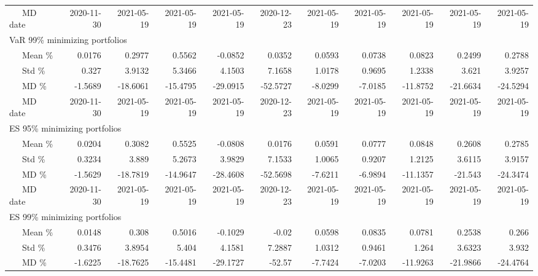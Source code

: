\begin{table}[!]
{\begin{tabular}{l*{10}{r}}
\ \ \ MD date &  2020-11-30 &  2021-05-19 &  2021-05-19 &  2021-05-19 &  2020-12-23 &  2021-05-19 &  2021-05-19 &  2021-05-19 &  2021-05-19 &  2021-05-19 \\
  \multicolumn{10}{l}{VaR 99\% minimizing portfolios}   \\
\ \ \ Mean \%  &      0.0176 &      0.2977 &      0.5562 &     -0.0852 &      0.0352 &      0.0593 &      0.0738 &      0.0823 &      0.2499 &      0.2788 \\
\ \ \ Std \%   &       0.327 &      3.9132 &      5.3466 &      4.1503 &      7.1658 &      1.0178 &      0.9695 &      1.2338 &       3.621 &      3.9257 \\
\ \ \ MD \%    &     -1.5689 &    -18.6061 &    -15.4795 &    -29.0915 &    -52.5727 &     -8.0299 &     -7.0185 &    -11.8752 &    -21.6634 &    -24.5294 \\
\ \ \ MD date &  2020-11-30 &  2021-05-19 &  2021-05-19 &  2021-05-19 &  2020-12-23 &  2021-05-19 &  2021-05-19 &  2021-05-19 &  2021-05-19 &  2021-05-19 \\
  \multicolumn{10}{l}{ES 95\% minimizing portfolios}   \\
\ \ \ Mean \%  &      0.0204 &      0.3082 &      0.5525 &     -0.0808 &      0.0176 &      0.0591 &      0.0777 &      0.0848 &      0.2608 &      0.2785 \\
\ \ \ Std \%   &      0.3234 &       3.889 &      5.2673 &      3.9829 &      7.1533 &      1.0065 &      0.9207 &      1.2125 &      3.6115 &      3.9157 \\
\ \ \ MD \%    &     -1.5629 &    -18.7819 &    -14.9647 &    -28.4608 &    -52.5698 &     -7.6211 &     -6.9894 &    -11.1357 &     -21.543 &    -24.3474 \\
\ \ \ MD date &  2020-11-30 &  2021-05-19 &  2021-05-19 &  2021-05-19 &  2020-12-23 &  2021-05-19 &  2021-05-19 &  2021-05-19 &  2021-05-19 &  2021-05-19 \\
  \multicolumn{10}{l}{ES 99\% minimizing portfolios}   \\
\ \ \ Mean \%  &      0.0148 &       0.308 &      0.5016 &     -0.1029 &       -0.02 &      0.0598 &      0.0835 &      0.0781 &      0.2538 &       0.266 \\
\ \ \ Std \%   &      0.3476 &      3.8954 &       5.404 &      4.1581 &      7.2887 &      1.0312 &      0.9461 &       1.264 &      3.6323 &       3.932 \\
\ \ \ MD \%    &     -1.6225 &    -18.7625 &    -15.4481 &    -29.1727 &      -52.57 &     -7.7424 &     -7.0203 &    -11.9263 &    -21.9866 &    -24.4764 \\

\end{tabular}}
\end{table}
